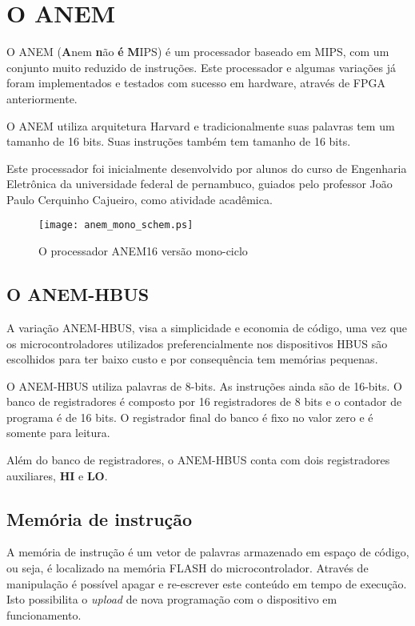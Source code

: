 \documentclass[11pt]{report}
\begin{document}
\section{O ANEM}

O ANEM (\textbf{A}nem \textbf{n}ão \textbf{é} \textbf{M}IPS) é um processador baseado em MIPS, com um conjunto muito reduzido de instruções. Este processador e algumas variações já foram implementados e testados com sucesso em hardware, através de FPGA anteriormente.

O ANEM utiliza arquitetura Harvard e tradicionalmente suas palavras tem um tamanho de 16 bits. Suas instruções também tem tamanho de 16 bits.

Este processador foi inicialmente desenvolvido por alunos do curso de Engenharia Eletrônica da universidade federal de pernambuco, guiados pelo professor João Paulo Cerquinho Cajueiro, como atividade acadêmica.

\begin{figure}[H]
\centering
\texttt{[image: anem\_mono\_schem.ps]}
\caption{O processador ANEM16 versão mono-ciclo}
\end{figure}

\subsection{O ANEM-HBUS}

A variação ANEM-HBUS, visa a simplicidade e economia de código, uma vez que os microcontroladores utilizados preferencialmente nos dispositivos HBUS são escolhidos para ter baixo custo e por consequência tem memórias pequenas.

O ANEM-HBUS utiliza palavras de 8-bits. As instruções ainda são de 16-bits. O banco de registradores é composto por 16 registradores de 8 bits e o contador de programa é de 16 bits. O registrador final do banco é fixo no valor zero e é somente para leitura.

Além do banco de registradores, o ANEM-HBUS conta com dois registradores auxiliares, \textbf{HI} e \textbf{LO}.

\subsection{Memória de instrução}

A memória de instrução é um vetor de palavras armazenado em espaço de código, ou seja, é localizado na memória FLASH do microcontrolador. Através de manipulação é possível apagar e re-escrever este conteúdo em tempo de execução. Isto possibilita o \textit{upload} de nova programação com o dispositivo em funcionamento.
\end{document}
